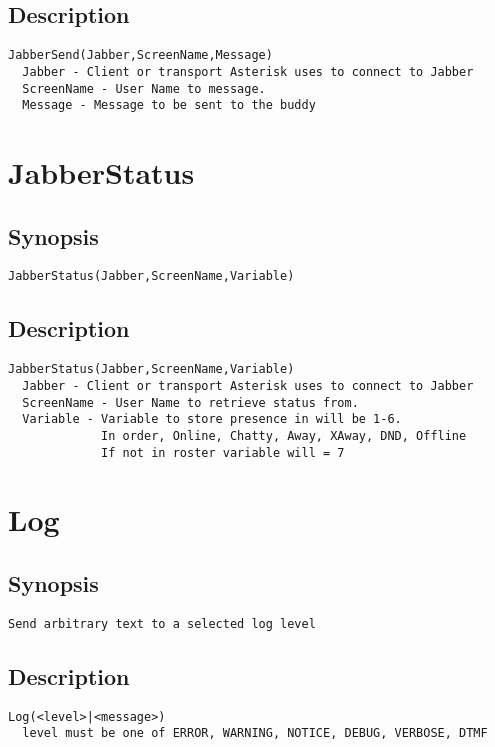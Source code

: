\subsection{Description}
\begin{verbatim}
JabberSend(Jabber,ScreenName,Message)
  Jabber - Client or transport Asterisk uses to connect to Jabber
  ScreenName - User Name to message.
  Message - Message to be sent to the buddy

\end{verbatim}


\section{JabberStatus}
\subsection{Synopsis}
\begin{verbatim}
JabberStatus(Jabber,ScreenName,Variable)
\end{verbatim}
\subsection{Description}
\begin{verbatim}
JabberStatus(Jabber,ScreenName,Variable)
  Jabber - Client or transport Asterisk uses to connect to Jabber
  ScreenName - User Name to retrieve status from.
  Variable - Variable to store presence in will be 1-6.
             In order, Online, Chatty, Away, XAway, DND, Offline
             If not in roster variable will = 7

\end{verbatim}


\section{Log}
\subsection{Synopsis}
\begin{verbatim}
Send arbitrary text to a selected log level
\end{verbatim}
\subsection{Description}
\begin{verbatim}
Log(<level>|<message>)
  level must be one of ERROR, WARNING, NOTICE, DEBUG, VERBOSE, DTMF

\end{verbatim}


